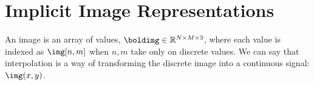 

\section{Implicit Image Representations}\label{sec:implicit_image_representations}

An image is an array of values, $\boldimg \in \mathbb{R}^{N \times M \times 3}$, where each value is indexed as $\img [n,m]$ when $n,m$ take only on discrete values. We can say that interpolation is a way of transforming the discrete image into a continuous signal: $\img (x,y)$.

